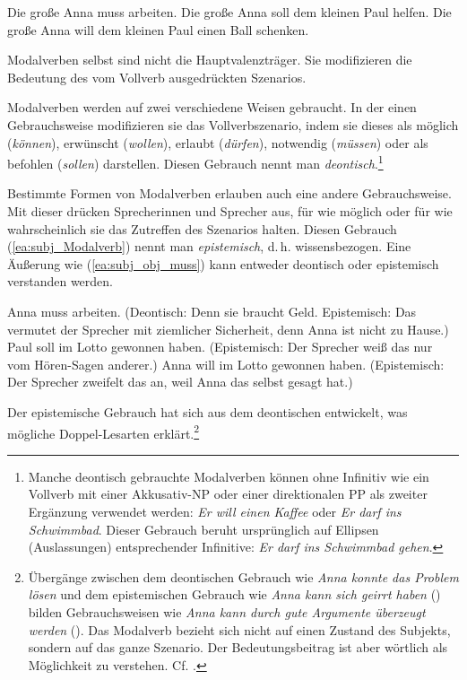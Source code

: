 \ea 
\ea \label{ea:muss_arbeiten} Die große Anna muss arbeiten.
\ex \label{ex:will_helfen} Die große Anna soll dem kleinen Paul helfen.
\ex \label{ex:soll_geben} Die große Anna will dem kleinen Paul einen Ball schenken.
\z 
\z     

Modalverben selbst sind nicht die Hauptvalenzträger. Sie modifizieren die Bedeutung des vom Vollverb ausgedrückten Szenarios.

Modalverben werden auf zwei verschiedene Weisen gebraucht. In der einen Gebrauchsweise modifizieren sie das Vollverbszenario, indem sie dieses als möglich (\textit{können}), erwünscht (\textit{wollen}), erlaubt (\textit{dürfen}), notwendig (\textit{müssen}) oder als befohlen (\textit{sollen}) darstellen. Diesen Gebrauch nennt man \textit{deontisch}.\footnote{Manche deontisch gebrauchte Modalverben können ohne Infinitiv wie ein Vollverb mit einer Akkusativ-NP oder einer direktionalen PP als zweiter Ergänzung verwendet werden: \textit{Er will einen Kaffee} oder \textit{Er darf ins Schwimmbad}. Dieser Gebrauch beruht ursprünglich auf Ellipsen (Auslassungen) entsprechender Infinitive: \zB \textit{Er darf ins Schwimmbad gehen}.}

Bestimmte Formen von Modalverben erlauben auch eine andere Gebrauchsweise. Mit dieser drücken Sprecherinnen und Sprecher aus, für wie möglich oder für wie wahrscheinlich sie das Zutreffen des Szenarios halten. Diesen Gebrauch (\ref{ea:subj_Modalverb}) nennt man \textit{epistemisch}, d.\,h. wissensbezogen. Eine Äußerung wie (\ref{ea:subj_obj_muss}) kann entweder deontisch oder epistemisch verstanden werden.


\ea \label{ea:subj_Modalverb}
\ea \label{ea:subj_obj_muss} Anna muss arbeiten. (Deontisch: Denn sie braucht Geld. Epistemisch: Das vermutet der Sprecher mit ziemlicher Sicherheit, denn Anna ist nicht zu Hause.)
\ex \label{ex:subj_soll} Paul soll im Lotto gewonnen haben. (Epistemisch: Der Sprecher weiß das nur vom Hören-Sagen anderer.)
\ex \label{ex:subj_will} Anna will im Lotto gewonnen haben. (Epistemisch: Der Sprecher zweifelt das an, weil Anna das selbst gesagt hat.)
\z 
\z 

Der epistemische Gebrauch hat sich aus dem deontischen entwickelt, was mögliche Doppel-Lesarten erklärt.\footnote{Übergänge zwischen dem deontischen Gebrauch wie \textit{Anna konnte das Problem lösen} und dem epistemischen Gebrauch wie \textit{Anna kann sich geirrt haben} () bilden Gebrauchsweisen wie \textit{Anna kann durch gute Argumente überzeugt werden} (). Das Modalverb bezieht sich nicht auf einen Zustand des Subjekts, sondern auf das ganze Szenario. Der Bedeutungsbeitrag ist aber wörtlich als Möglichkeit zu verstehen. Cf. \citet[33, 79--86]{Diewald1999}.}

